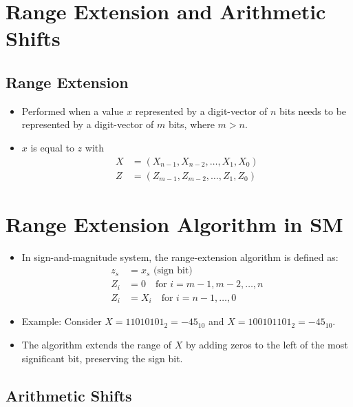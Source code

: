 \documentclass[12pt,openany, tikz,border=10pt]{book}
\begin{document}
  \section{Range Extension
  and Arithmetic Shifts}
\subsection{Range Extension}



\begin{itemize}
  \item[] Performed when a value \( x \) represented by a digit-vector of \( n \) bits needs to be represented by a digit-vector of \( m \) bits, where \( m > n \).
  \item[] \( x \) is equal to \( z \) with
  \begin{align*}
      X &= (X_{n-1}, X_{n-2}, \ldots, X_1, X_0) \\
      Z &= (Z_{m-1}, Z_{m-2}, \ldots, Z_1, Z_0)
  \end{align*}
\end{itemize}

{\small \section[]{Range Extension Algorithm in SM}}

\begin{itemize}
    \item[] In sign-and-magnitude system, the range-extension algorithm is defined as:
    \begin{align*}
        z_s &= x_s \text{ (sign bit)} \\
        Z_i &= 0 \quad \text{for } i = m - 1, m - 2, \ldots, n \\
        Z_i &= X_i \quad \text{for } i = n - 1, \ldots, 0
    \end{align*}
    \item[] Example: Consider \( X = 11010101_2 = -45_{10} \) and \( X = 100101101_2 = -45_{10} \).
    \item[] The algorithm extends the range of \( X \) by adding zeros to the left of the most significant bit, preserving the sign bit.
\end{itemize}


\subsection[]{Arithmetic Shifts}
\end{document}

